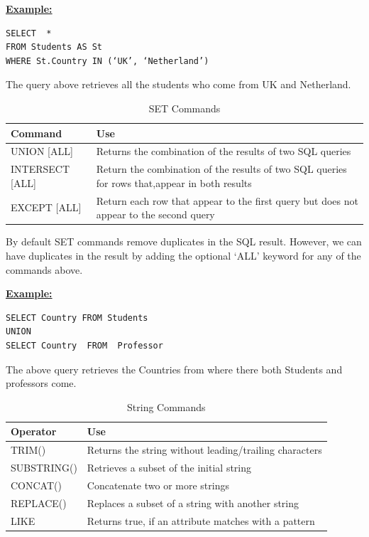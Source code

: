 \hfill\newpage
\noindent\textbf{\underline{Example:}}
\begin{mdframed}[backgroundcolor=lightgray!20] 
\begin{lstlisting}[style=SQL]
SELECT  *
FROM Students AS St 
WHERE St.Country IN (‘UK’, ‘Netherland’)
\end{lstlisting}
\end{mdframed}
The query above  retrieves all the students who come from UK and Netherland.

\begin{table}[h]
\centering
\caption{SET Commands }
\label{my-label}
\begin{tabular}{|p{3cm}|p{11.5cm}| }
\hline
\textbf{Command}     & \textbf{Use}                                                                                           \\ \hline
UNION {[}ALL{]}     & Returns the combination of the results of two SQL queries                                     \\ \hline
INTERSECT {[}ALL{]} & Return the combination of the results of two SQL queries for rows that,appear in both results \\ \hline
EXCEPT {[}ALL{]}    & Return each row that appear to the first query but does not appear to the second query        \\ \hline
\end{tabular}
\end{table}

By default SET commands remove duplicates in the SQL result. However, we can have duplicates in the result by adding the optional ‘ALL’ keyword for any of the commands above.  

\noindent\textbf{\underline{Example:}}
\begin{mdframed}[backgroundcolor=lightgray!20] 
\begin{lstlisting}[style=SQL]
SELECT Country FROM Students 
UNION
SELECT Country  FROM  Professor
\end{lstlisting}
\end{mdframed}
The above query retrieves the Countries from where there both Students and professors come. 

\begin{table}[h]
\centering
\caption{String Commands}
\label{my-label}
\begin{tabular}{|p{3cm}|p{11.5cm}| }
\hline
\textbf{Operator} & \textbf{Use}                                         \\ \hline
TRIM()            & Returns the string without leading/trailing characters \\ \hline
SUBSTRING()       & Retrieves a subset of the initial string               \\ \hline
CONCAT()          & Concatenate two or more strings                        \\ \hline
REPLACE()         & Replaces a subset of a string with another string      \\ \hline
LIKE              & Returns true, if an attribute matches with a pattern   \\ \hline
\end{tabular}
\end{table}

